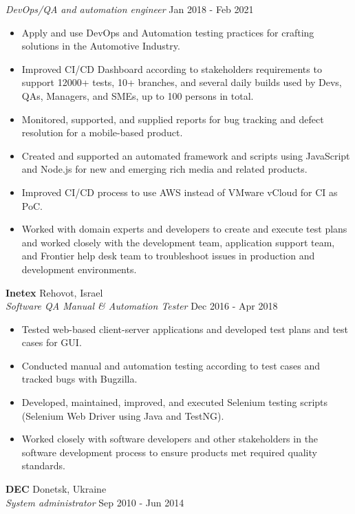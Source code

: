 \documentclass[a4paper]{article}
\begin{document}
\textit{DevOps/QA and automation engineer} \hfill Jan 2018 - Feb 2021\\
\vspace{-1mm}
\begin{itemize} \itemsep 1pt
	\item Apply and use DevOps and Automation testing practices for crafting solutions in the Automotive Industry.
	\item 	Improved CI/CD Dashboard according to stakeholders\textquotesingle{} requirements to support 12000+ tests, 10+ branches, and several daily builds used by Devs, QAs, Managers, and SMEs, up to 100 persons in total.
	\item 	Monitored, supported, and supplied reports for bug tracking and defect resolution for a mobile-based product.
	\item 	Created and supported an automated framework and scripts using JavaScript and Node.js for new and emerging rich media and related products.
	\item 	Improved CI/CD process to use AWS instead of VMware vCloud for CI as PoC.
	\item 	Worked with domain experts and developers to create and execute test plans and worked closely with the development team, application support team, and Frontier help desk team to troubleshoot issues in production and development environments.
\end{itemize}
\textbf{Inetex} \hfill Rehovot, Israel\\
\textit{Software QA Manual \& Automation Tester} \hfill Dec 2016 - Apr 2018\\
\vspace{-1mm}
\begin{itemize} \itemsep 1pt
	\item 	Tested web-based client-server applications and developed test plans and test cases for GUI.
	\item 	Conducted manual and automation testing according to test cases and tracked bugs with Bugzilla.
	\item 	Developed, maintained, improved, and executed Selenium testing scripts (Selenium Web Driver using Java and TestNG).
	\item 	Worked closely with software developers and other stakeholders in the software development process to ensure products met required quality standards.
\end{itemize}
\textbf{DEC} \hfill Donetsk, Ukraine\\
\textit{System administrator} \hfill Sep 2010 - Jun 2014\\
\end{document}
